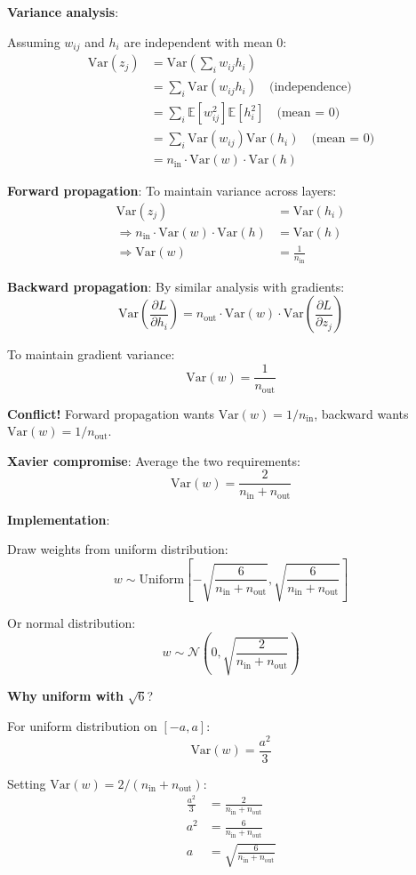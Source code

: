 \documentclass[11pt,oneside]{book}
\begin{document}
\textbf{Variance analysis}:

Assuming $w_{ij}$ and $h_i$ are independent with mean 0:
\begin{align*}
\text{Var}(z_j) &= \text{Var}\left(\sum_i w_{ij} h_i\right) \\
&= \sum_i \text{Var}(w_{ij} h_i) \quad \text{(independence)} \\
&= \sum_i \mathbb{E}[w_{ij}^2] \mathbb{E}[h_i^2] \quad \text{(mean = 0)} \\
&= \sum_i \text{Var}(w_{ij}) \text{Var}(h_i) \quad \text{(mean = 0)} \\
&= n_{\text{in}} \cdot \text{Var}(w) \cdot \text{Var}(h)
\end{align*}

\textbf{Forward propagation}: To maintain variance across layers:
\begin{align*}
\text{Var}(z_j) &= \text{Var}(h_i) \\
\Rightarrow n_{\text{in}} \cdot \text{Var}(w) \cdot \text{Var}(h) &= \text{Var}(h) \\
\Rightarrow \text{Var}(w) &= \frac{1}{n_{\text{in}}}
\end{align*}

\textbf{Backward propagation}: By similar analysis with gradients:
\[
\text{Var}\left(\frac{\partial L}{\partial h_i}\right) = n_{\text{out}} \cdot \text{Var}(w) \cdot \text{Var}\left(\frac{\partial L}{\partial z_j}\right)
\]

To maintain gradient variance:
\[
\text{Var}(w) = \frac{1}{n_{\text{out}}}
\]

\textbf{Conflict!} Forward propagation wants $\text{Var}(w) = 1/n_{\text{in}}$, backward wants $\text{Var}(w) = 1/n_{\text{out}}$.

\textbf{Xavier compromise}: Average the two requirements:
\[
\text{Var}(w) = \frac{2}{n_{\text{in}} + n_{\text{out}}}
\]

\textbf{Implementation}:

Draw weights from uniform distribution:
\[
w \sim \text{Uniform}\left[-\sqrt{\frac{6}{n_{\text{in}} + n_{\text{out}}}}, \sqrt{\frac{6}{n_{\text{in}} + n_{\text{out}}}}\right]
\]

Or normal distribution:
\[
w \sim \mathcal{N}\left(0, \sqrt{\frac{2}{n_{\text{in}} + n_{\text{out}}}}\right)
\]

\textbf{Why uniform with} $\sqrt{6}$?

For uniform distribution on $[-a, a]$:
\[
\text{Var}(w) = \frac{a^2}{3}
\]

Setting $\text{Var}(w) = 2/(n_{\text{in}} + n_{\text{out}})$:
\begin{align*}
\frac{a^2}{3} &= \frac{2}{n_{\text{in}} + n_{\text{out}}} \\
a^2 &= \frac{6}{n_{\text{in}} + n_{\text{out}}} \\
a &= \sqrt{\frac{6}{n_{\text{in}} + n_{\text{out}}}}
\end{align*}
\end{document}
